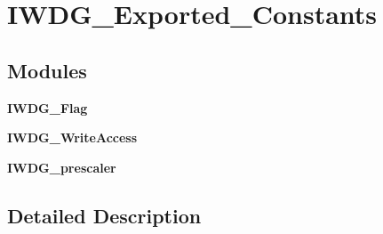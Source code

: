 \section{I\+W\+D\+G\+\_\+\+Exported\+\_\+\+Constants}
\label{group__IWDG__Exported__Constants}
\subsection*{Modules}
\begin{DoxyCompactItemize}
\item 
\textbf{ I\+W\+D\+G\+\_\+\+Flag}
\item 
\textbf{ I\+W\+D\+G\+\_\+\+Write\+Access}
\item 
\textbf{ I\+W\+D\+G\+\_\+prescaler}
\end{DoxyCompactItemize}


\subsection{Detailed Description}
